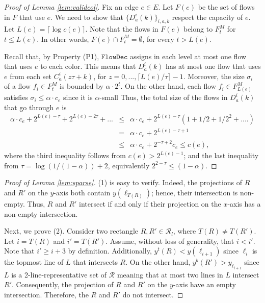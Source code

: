 \documentclass[a4paper,UKenglish]{lipics-v2016}
\theoremstyle{plain}
\newcommand{\cR}{\mathcal{R}}
\newcommand{\Fmid}{F^M}
\begin{document}
\begin{proof}[Proof of Lemma \ref{lem:validcol}]
Fix an edge $e\in E$. Let $F(e)$ be the set of flows in $F$ that use $e$. We need to show that $\{D^i_a(k)\}_{i,a,k}$ respect the capacity of $e$. Let $L(e)= \lceil \log c(e) \rceil$.
Note that the flows in $F(e)$  belong to $\Fmid_t$ for $t\leq L(e)$. In other words, $F(e)\cap\Fmid_t = \emptyset$, for every $t>L(e)$.

Recall that, by Property (P1), $\mathtt{FlowDec}$ assigns in each level at most one flow that uses $e$ to each color. This means that $D^i_a(k)$ has at most one flow that uses $e$ from each set $C^i_a(z\tau+k)$, for $z=0,...,\lceil L(e)/\tau\rceil-1$.
%
Moreover, the size $\sigma_i$ of a flow $f_i\in \Fmid_t$ is bounded by $\alpha\cdot 2^t$.
%
On the other hand, each flow $f_i\in\Fmid_{L(e)}$ satisfies $\sigma_i\leq \alpha\cdot c_e$ since it is $\alpha$-small
%
Thus, the total size of the flows in $D^i_a(k)$ that go through $e$ is
\begin{eqnarray*}
\alpha \cdot c_e + 2^{L(e)-\tau} +  2^{L(e)-2\tau}+... &\leq& \alpha\cdot c_e + 2^{L(e)-\tau}(1+1/2+1/2^2+....)\\
&=& \alpha\cdot c_e + 2^{L(e)-\tau+1}\\ 
&\leq& \alpha\cdot c_e + 2^{-\tau+2} c_e 
\leq c(e),
\end{eqnarray*}
where the third inequality follows from $c(e) >2^{L(e)-1}$; and the last inequality from $\tau = \log (1/(1-\alpha)) +2$, equivalently $2^{2-\tau}\leq (1-\alpha)$.
\end{proof}

\begin{proof}[Proof of Lemma \ref{lem:sparse}]
(1) is easy to verify. Indeed, the projections of $R$ and $R'$ on the $y$-axis both contain $y(\ell_{T(R)})$; hence, their intersection is non-empty. Thus, $R$ and $R'$ intersect if and only if their projection on the $x$-axis has a non-empty intersection.

Next, we prove (2). Consider two rectangle $R,R'\in \cR_l$, where $T(R)\neq T(R')$.
Let $i=T(R)$ and $i'=T(R')$. Assume, without loss of generality, that $i<i'$. Note that $i'\geq i+3$ by definition. Additionally, $y^t(R)<y(\ell_{i+1})$ since $\ell_i$ is the topmost line of $L$ that intersects $R$. On the other hand, $y^b(R')>y_{\ell_{i+1}}$ since $L$ is a 2-line-representative set of $\cR$ meaning that at most two lines in $L$  intersect $R'$. Consequently, the projection of $R$ and $R'$ on the $y$-axis have an empty intersection. Therefore, the $R$ and $R'$ do not intersect.
\end{proof}
\end{document}
